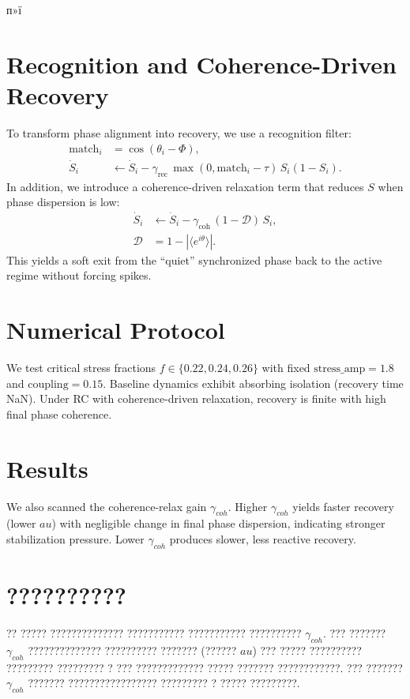 ﻿п»ї\documentclass[12pt,a4paper]{article}
\begin{document}
\section{Recognition and Coherence-Driven Recovery}
To transform phase alignment into recovery, we use a recognition filter:
\begin{align}
\mathrm{match}_i &= \cos(\theta_i - \Phi), \\
\dot{S}_i &\leftarrow \dot{S}_i - \gamma_{\mathrm{rec}}\,\max(0,\mathrm{match}_i-\tau)\,S_i(1-S_i).
\end{align}
In addition, we introduce a coherence-driven relaxation term that reduces $S$ when phase dispersion is low:
\begin{align}
\dot{S}_i &\leftarrow \dot{S}_i - \gamma_{\mathrm{coh}}\,(1-\mathcal{D})\,S_i, \\
\mathcal{D} &= 1 - \left|\langle e^{i\theta}\rangle\right|.
\end{align}
This yields a soft exit from the ``quiet'' synchronized phase back to the active regime without forcing spikes.

\section{Numerical Protocol}
We test critical stress fractions $f\in\{0.22,0.24,0.26\}$ with fixed $\mathrm{stress\_amp}=1.8$ and $\mathrm{coupling}=0.15$. Baseline dynamics exhibit absorbing isolation (recovery time NaN). Under RC with coherence-driven relaxation, recovery is finite with high final phase coherence.

\section{Results}
We also scanned the coherence-relax gain $\gamma_{coh}$. Higher $\gamma_{coh}$ yields faster recovery (lower $	au$) with negligible change in final phase dispersion, indicating stronger stabilization pressure. Lower $\gamma_{coh}$ produces slower, less reactive recovery.

\section{??????????}
?? ????? ?????????????? ??????????? ??????????? ?????????? $\gamma_{coh}$. ??? ??????? $\gamma_{coh}$ ?????????????? ?????????? ??????? (?????? $	au$) ??? ????? ?????????? ????????? ????????? ? ??? ????????????? ????? ??????? ????????????. ??? ??????? $\gamma_{coh}$ ??????? ????????????????? ????????? ? ????? ?????????.
\end{document}
